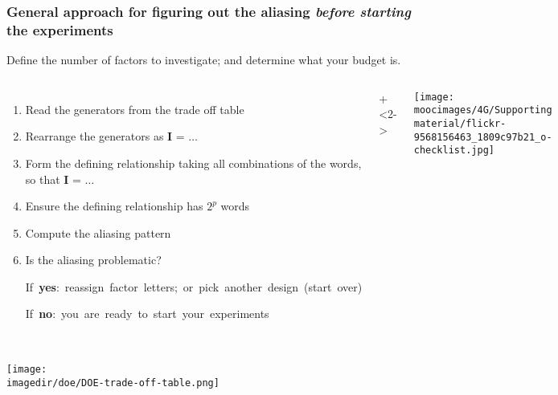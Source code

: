 \documentclass[handout,11pt,aspectratio=169,mathserif]{beamer}
\begin{document}
\begin{frame}\frametitle{General approach for figuring out the aliasing \emph{before starting} the experiments}
	
	\vspace{0.5cm}
	Define the number of factors to investigate; and determine what your budget is.
	
	\vspace{0.5cm}
	\begin{columns}[T]
			\begin{enumerate}
				\item	Read the generators from the trade off table 
				\item	Rearrange the generators as  $\textbf{I = \ldots}$
			 	\item	Form the {\color{purple}defining relationship} taking all combinations of the words, so that $\textbf{I = \ldots}$
			 	\item	Ensure the defining relationship has $2^p$ words
				\item	Compute the aliasing pattern
				\item	{\color{myGreen}Is the aliasing problematic?}
				
					\hbox{\hspace{3.5em}If \textbf{yes}: reassign factor letters; or pick another design (start over)}
					
					\hbox{\hspace{3.5em}If \textbf{no}: you are ready to start your experiments}
			\end{enumerate}
			
			\onslide+<2->{
				\centerline{\texttt{[image: \\moocimages/4G/Supporting material/flickr-9568156463\_1809c97b21\_o-checklist.jpg]}}
			
			}
	\end{columns}

	
\end{frame}

\begin{frame}\frametitle{}
	\centerline{\texttt{[image: \\imagedir/doe/DOE-trade-off-table.png]}}
\end{frame}
\end{document}
